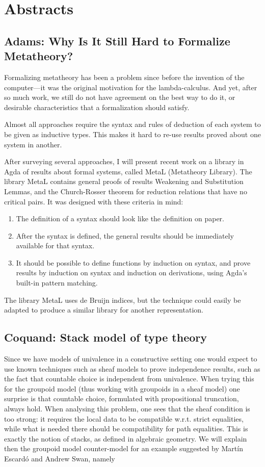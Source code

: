 \documentclass[a4paper,10pt]{scrartcl}
\begin{document}
  
  
  
\section*{Abstracts}

\subsection*{Adams: Why Is It Still Hard to Formalize Metatheory?}

Formalizing metatheory has been a problem since before the invention of the computer---it was the original motivation for the lambda-calculus.  
And yet, after so much work, we still do not have agreement on the best way to do it, or desirable characteristics that a formalization should satisfy.

Almost all approaches require the syntax and rules of deduction of each system to be given as inductive types.  
This makes it hard to re-use results proved about one system in another.

After surveying several approaches, I will present recent work on a library in Agda of results about formal systems, called MetaL (Metatheory Library).  
The library MetaL contains general proofs of results Weakening and Substitution Lemmas, and the Church-Rosser theorem for reduction relations that have no critical pairs.  
It was designed with these criteria in mind: 
\begin{enumerate}
 \item The definition of a syntax should look like the definition on paper.  
 \item After the syntax is defined, the general results should be immediately available for that syntax.  
 \item It should be possible to define functions by induction on syntax, and prove results by induction on syntax and induction on derivations, using Agda's built-in pattern matching.  
\end{enumerate}
 The library MetaL uses de Bruijn indices, but the technique could easily be adapted to produce a similar library for another representation.

\subsection*{Coquand: Stack model of type theory}

Since we have models of univalence in a constructive setting one would expect to use known techniques such as sheaf models to prove independence results, 
such as the fact that countable choice is independent from univalence. 
When trying this for the groupoid model (thus working with groupoids in a sheaf model) one surprise is that countable choice, formulated with propositional truncation, always hold. 
When analysing this problem, one sees that the sheaf condition is too strong: it requires the local data to be compatible w.r.t. strict equalities, 
while what is needed there should be compatibility for path equalities. This is exactly the notion of stacks, as defined in algebraic geometry. 
We will explain then the groupoid model counter-model for an example suggested by Martín Escardó and Andrew Swan, namely
\end{document}
